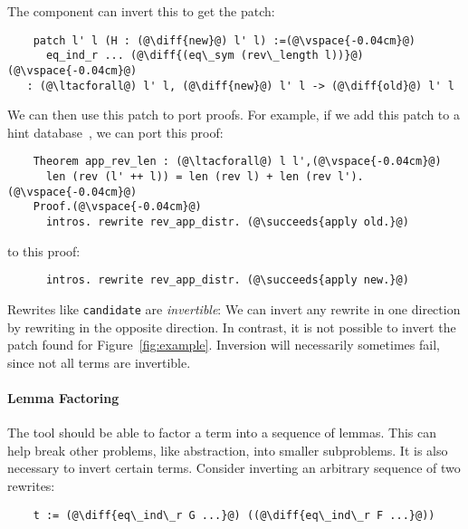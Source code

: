 The component can invert this to get the patch: %

\begin{lstlisting}
    patch l' l (H : (@\diff{new}@) l' l) :=(@\vspace{-0.04cm}@)
      eq_ind_r ... (@\diff{(eq\_sym (rev\_length l))}@)(@\vspace{-0.04cm}@)
   : (@\ltacforall@) l' l, (@\diff{new}@) l' l -> (@\diff{old}@) l' l
\end{lstlisting}

We can then use this patch to port proofs.
For example, if we add this patch to a hint database~\cite{hints},
we can port this proof:

\begin{lstlisting}
    Theorem app_rev_len : (@\ltacforall@) l l',(@\vspace{-0.04cm}@)
      len (rev (l' ++ l)) = len (rev l) + len (rev l').(@\vspace{-0.04cm}@)
    Proof.(@\vspace{-0.04cm}@)
      intros. rewrite rev_app_distr. (@\succeeds{apply old.}@)
\end{lstlisting}
to this proof:

\begin{lstlisting}
      intros. rewrite rev_app_distr. (@\succeeds{apply new.}@)
\end{lstlisting}

Rewrites like \lstinline{candidate} are \textit{invertible}:
We can invert any rewrite in one direction by rewriting in the opposite direction.
In contrast, it is not possible to invert the patch \sysname
found for Figure~\ref{fig:example}.
Inversion will necessarily sometimes fail, since not all terms are invertible.

\paragraph{Lemma Factoring} The tool should be able to factor a term into a sequence of lemmas.
This can help break other problems, like abstraction, into smaller subproblems.
It is also necessary to invert certain terms.
Consider inverting an arbitrary sequence of two rewrites:

\begin{lstlisting}
    t := (@\diff{eq\_ind\_r G ...}@) ((@\diff{eq\_ind\_r F ...}@))
\end{lstlisting}

